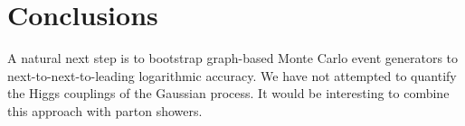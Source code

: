 \section{Conclusions}\label{sec:conclusions}

A natural next step is to bootstrap graph-based Monte Carlo event
generators to next-to-next-to-leading logarithmic accuracy. We have not
attempted to quantify the Higgs couplings of the Gaussian process. It
would be interesting to combine this approach with parton showers.

